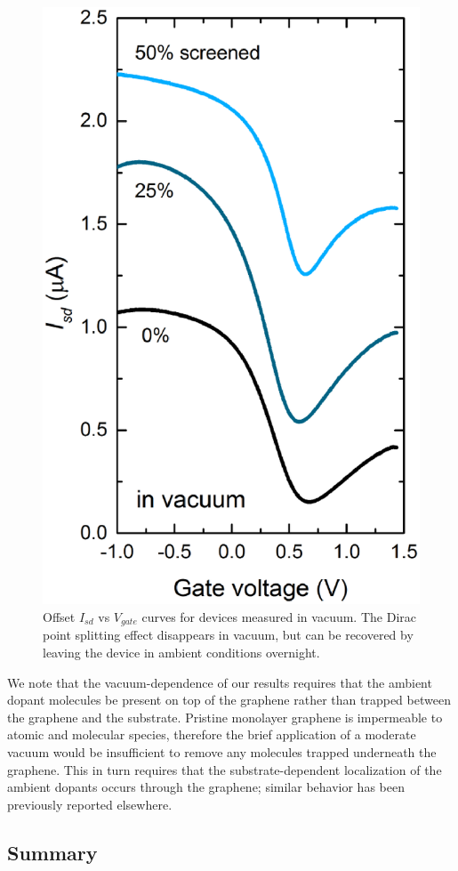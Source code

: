 \documentclass[edeposit,fullpage,draftthesis]{uiucthesis2009}
\begin{document}
\begin{figure}
  \centering
  \includegraphics[width=.5\textwidth]{images/resultsanddiscussion/pztpaper/figure4}
  \caption[I-V curves for graphene-ferroelectric pn junction devices measured in vacuum]{
   Offset $I_{sd}$ vs $V_{gate}$ curves for devices measured in vacuum. The Dirac point splitting effect disappears in vacuum, but can be recovered by leaving the device in ambient conditions overnight.
  }
  \label{fig:PZTvacuum}
\end{figure}

        We note that the vacuum-dependence of our results requires that the ambient dopant molecules be present on top of the graphene rather than trapped between the graphene and the substrate. Pristine monolayer graphene is impermeable to atomic and molecular species\cite{Bunch2008}, therefore the brief application of a moderate vacuum would be insufficient to remove any molecules trapped underneath the graphene. This in turn requires that the substrate-dependent localization of the ambient dopants occurs through the graphene; similar behavior has been previously reported elsewhere\cite{Moser2007, Moser2008, Lohmann2009, Lafkioti2010}.


    \subsection{Summary}
\end{document}
